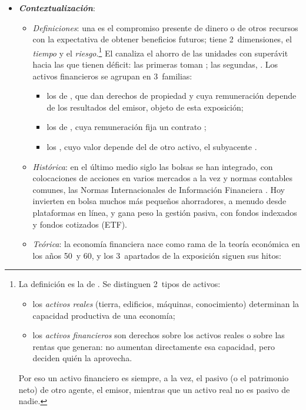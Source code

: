 \documentclass[11pt]{article}
\begin{document}
\begin{itemize}
\item \textbf{\emph{Contextualización}}:
  \begin{itemize}
  \item \emph{Definiciones}: una  es el compromiso presente de dinero o de otros recursos con la expectativa de obtener beneficios futuros; tiene 2~dimensiones, el \emph{tiempo} y el \emph{riesgo}.\footnote{La definición es la de \textcite[cap.~1]{BodieKaneMarcus2021Investments}. Se distinguen 2~tipos de activos:
\begin{itemize}
\item los \emph{activos reales} (tierra, edificios, máquinas, conocimiento) determinan la capacidad productiva de una economía;
\item los \emph{activos financieros} son derechos sobre los activos reales o sobre las rentas que generan: no aumentan directamente esa capacidad, pero deciden quién la aprovecha.
\end{itemize}
Por eso un activo financiero es siempre, a la vez, el pasivo (o el patrimonio neto) de otro agente, el emisor, mientras que un activo real no es pasivo de nadie.} El  canaliza el ahorro de las unidades con superávit hacia las que tienen déficit: las primeras toman ; las segundas, . Los activos financieros se agrupan en 3~familias:
    \begin{itemize}
    \item los de , que dan derechos de propiedad y cuya remuneración depende de los resultados del emisor, objeto de esta exposición;
    \item los de , cuya remuneración fija un contrato ;
    \item los , cuyo valor depende del de otro activo, el subyacente .
    \end{itemize}
  \item \emph{Histórica}: en el último medio siglo las bolsas se han integrado, con colocaciones de acciones en varios mercados a la vez y normas contables comunes, las Normas Internacionales de Información Financiera . Hoy invierten en bolsa muchos más pequeños ahorradores, a menudo desde plataformas en línea, y gana peso la gestión pasiva, con fondos indexados y fondos cotizados (ETF).
  \item \emph{Teórica}: la economía financiera nace como rama de la teoría económica en los años 50~y 60, y los 3~apartados de la exposición siguen sus hitos:

\end{itemize}
\end{itemize}
\end{document}
